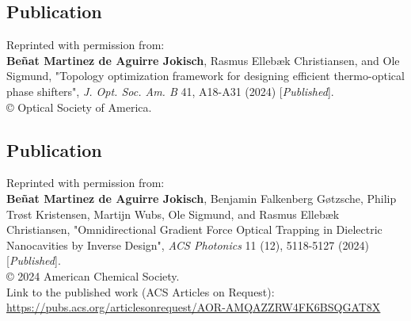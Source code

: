 \cleardoublepage
\vspace*{0.4\textheight}
\begin{center}
  \begin{minipage}{0.9\linewidth}
    \section*{Publication \cite{ownpub0}}

    Reprinted with permission from:\\ 

    \textbf{Beñat Martinez de Aguirre Jokisch}, Rasmus Ellebæk Christiansen, and Ole Sigmund, "Topology optimization framework for designing efficient thermo-optical phase shifters", \textit{J. Opt. Soc. Am. B} 41, A18-A31 (2024) [\textit{Published}]. \\
  
    © Optical Society of America.

  \end{minipage}
\end{center}
\newpage

\cleardoublepage
\vspace*{0.4\textheight}
\begin{center}
  \begin{minipage}{0.9\linewidth}
    \section*{Publication \cite{ownpub1}}

    Reprinted with permission from:\\ 

    \textbf{Beñat Martinez de Aguirre Jokisch}, Benjamin Falkenberg Gøtzsche, Philip Trøst Kristensen, Martijn Wubs, Ole Sigmund, and Rasmus Ellebæk Christiansen, "Omnidirectional Gradient Force Optical Trapping in Dielectric Nanocavities by Inverse Design", \textit{ACS Photonics} 11 (12), 5118-5127 (2024) [\textit{Published}]. \\

    © 2024 American Chemical Society.\\

    Link to the published work (ACS Articles on Request):\\
     \url{https://pubs.acs.org/articlesonrequest/AOR-AMQAZZRW4FK6BSQGAT8X}
  \end{minipage}
\end{center}
